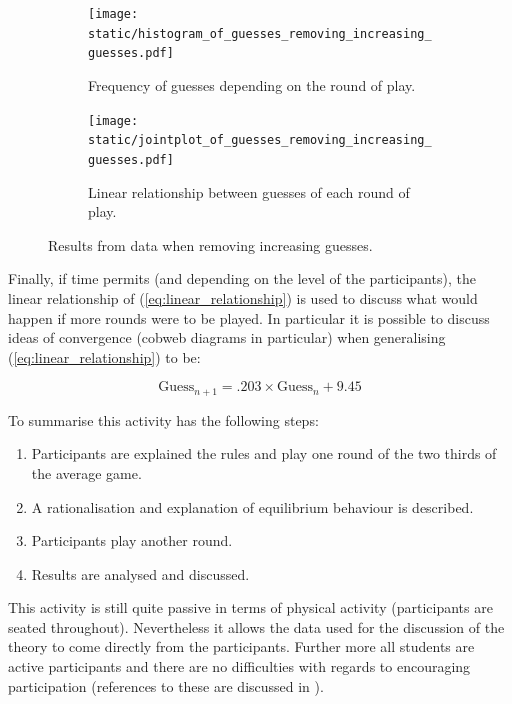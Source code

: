 \documentclass{article}
\begin{document}
\begin{figure}[!hbtp]
    \begin{subfigure}{.6\textwidth}
        \centering
        \texttt{[image: static/histogram\_of\_guesses\_removing\_increasing\_guesses.pdf]}
        \caption{Frequency of guesses depending on the round of play.}
        \label{fig:histogram_of_guess_with_decreasing_guess}
    \end{subfigure}
    \begin{subfigure}{.4\textwidth}
        \centering
        \texttt{[image: static/jointplot\_of\_guesses\_removing\_increasing\_guesses.pdf]}
        \caption{Linear relationship between guesses of each round of play.}
        \label{fig:jointplot_of_guess_with_decreasing_guess}
    \end{subfigure}
    \caption{Results from data when removing increasing guesses.}
    \label{fig:results_with_decreasing_guess}
\end{figure}

Finally, if time permits (and depending on the level of the participants), the
linear relationship of (\ref{eq:linear_relationship}) is used to discuss what
would happen if more rounds were to be played. In particular it is possible to
discuss ideas of convergence (cobweb diagrams in particular) when generalising
(\ref{eq:linear_relationship}) to be:

\begin{equation}
    \text{Guess}_{n+1} = .203\times\text{Guess}_n + 9.45
    \label{eq:extrapolated_linear_relationship}
\end{equation}

To summarise this activity has the following steps:

\begin{enumerate}
    \item Participants are explained the rules and play one round of the two
        thirds of the average game.
    \item A rationalisation and explanation of equilibrium behaviour is
        described.
    \item Participants play another round.
    \item Results are analysed and discussed.
\end{enumerate}

This activity is still quite passive in terms of physical activity (participants are
seated throughout). Nevertheless it allows the data used for the discussion of
the theory to come directly from the participants. Further more all students
are active participants and there are no difficulties with regards to
encouraging participation (references to these are discussed in \cite{Rocca2010}).
\end{document}
